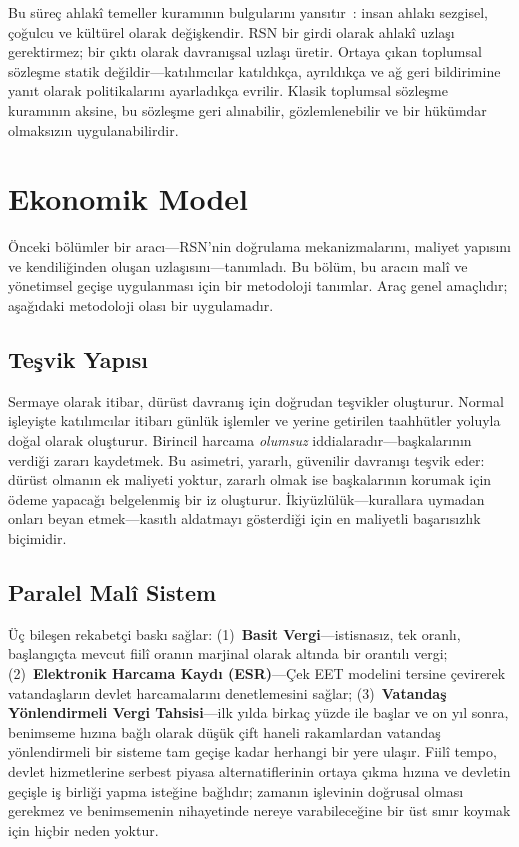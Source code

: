 \documentclass[11pt,a4paper,twocolumn]{article}
\begin{document}
Bu süreç ahlakî temeller kuramının bulgularını yansıtır~\cite{haidt2012}: insan ahlakı sezgisel, çoğulcu ve kültürel olarak değişkendir. RSN bir girdi olarak ahlakî uzlaşı gerektirmez; bir çıktı olarak davranışsal uzlaşı üretir. Ortaya çıkan toplumsal sözleşme statik değildir---katılımcılar katıldıkça, ayrıldıkça ve ağ geri bildirimine yanıt olarak politikalarını ayarladıkça evrilir. Klasik toplumsal sözleşme kuramının aksine, bu sözleşme geri alınabilir, gözlemlenebilir ve bir hükümdar olmaksızın uygulanabilirdir.

\section{Ekonomik Model}

Önceki bölümler bir aracı---RSN'nin doğrulama mekanizmalarını, maliyet yapısını ve kendiliğinden oluşan uzlaşısını---tanımladı. Bu bölüm, bu aracın malî ve yönetimsel geçişe uygulanması için bir metodoloji tanımlar. Araç genel amaçlıdır; aşağıdaki metodoloji olası bir uygulamadır.

\subsection{Teşvik Yapısı}

Sermaye olarak itibar, dürüst davranış için doğrudan teşvikler oluşturur. Normal işleyişte katılımcılar itibarı günlük işlemler ve yerine getirilen taahhütler yoluyla doğal olarak oluşturur. Birincil harcama \emph{olumsuz} iddialaradır---başkalarının verdiği zararı kaydetmek. Bu asimetri, yararlı, güvenilir davranışı teşvik eder: dürüst olmanın ek maliyeti yoktur, zararlı olmak ise başkalarının korumak için ödeme yapacağı belgelenmiş bir iz oluşturur. İkiyüzlülük---kurallara uymadan onları beyan etmek---kasıtlı aldatmayı gösterdiği için en maliyetli başarısızlık biçimidir.

\subsection{Paralel Malî Sistem}

Üç bileşen rekabetçi baskı sağlar: (1)~\textbf{Basit Vergi}---istisnasız, tek oranlı, başlangıçta mevcut fiilî oranın marjinal olarak altında bir orantılı vergi; (2)~\textbf{Elektronik Harcama Kaydı (ESR)}---Çek EET modelini tersine çevirerek vatandaşların devlet harcamalarını denetlemesini sağlar; (3)~\textbf{Vatandaş Yönlendirmeli Vergi Tahsisi}---ilk yılda birkaç yüzde ile başlar ve on yıl sonra, benimseme hızına bağlı olarak düşük çift haneli rakamlardan vatandaş yönlendirmeli bir sisteme tam geçişe kadar herhangi bir yere ulaşır. Fiilî tempo, devlet hizmetlerine serbest piyasa alternatiflerinin ortaya çıkma hızına ve devletin geçişle iş birliği yapma isteğine bağlıdır; zamanın işlevinin doğrusal olması gerekmez ve benimsemenin nihayetinde nereye varabileceğine bir üst sınır koymak için hiçbir neden yoktur.
\end{document}

